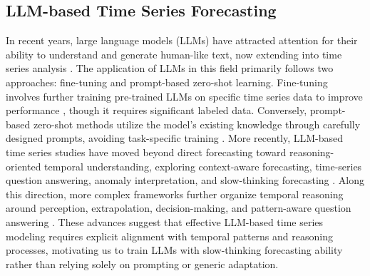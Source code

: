 \subsection{LLM-based Time Series Forecasting}
In recent years, large language models (LLMs) have attracted attention for their ability to understand and generate human-like text, now extending into time series analysis \citep{zhang2024large,jiang2024empowering,jin2024position}. The application of LLMs in this field primarily follows two approaches: fine-tuning and prompt-based zero-shot learning. Fine-tuning involves further training pre-trained LLMs on specific time series data to improve performance \citep{chang2023llm4ts,chang2024align,liu2025calf,jin2023time}, though it requires significant labeled data. Conversely, prompt-based zero-shot methods utilize the model's existing knowledge through carefully designed prompts, avoiding task-specific training \citep{gruver2023large,liu2024lstprompt}.
More recently, LLM-based time series studies have moved beyond direct forecasting toward reasoning-oriented temporal understanding, exploring context-aware forecasting, time-series question answering, anomaly interpretation, and slow-thinking forecasting \citep{wang2025itformer,kong2025time, ni2026streasoner}. Along this direction, more complex frameworks further organize temporal reasoning around perception, extrapolation, decision-making, and pattern-aware question answering \citep{guan2025timeomni,lu2026patra, tao2026cast}.
These advances suggest that effective LLM-based time series modeling requires explicit alignment with temporal patterns and reasoning processes, motivating us to train LLMs with slow-thinking forecasting ability rather than relying solely on prompting or generic adaptation.





